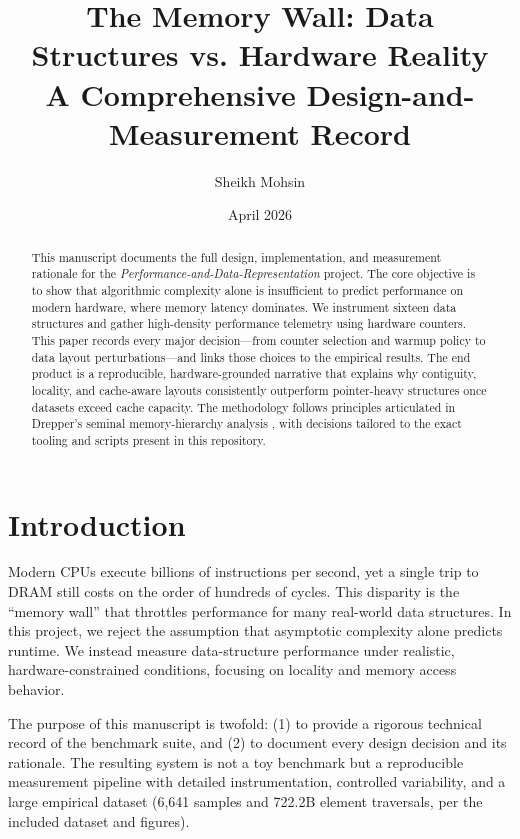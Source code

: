 \documentclass[11pt]{article}
\title{The Memory Wall: Data Structures vs. Hardware Reality \\
\large A Comprehensive Design-and-Measurement Record}
\author{Sheikh Mohsin}
\date{April 2026}
\begin{document}
\maketitle

\begin{abstract}
This manuscript documents the full design, implementation, and measurement rationale for the \textit{Performance-and-Data-Representation} project. The core objective is to show that algorithmic complexity alone is insufficient to predict performance on modern hardware, where memory latency dominates. We instrument sixteen data structures and gather high-density performance telemetry using hardware counters. This paper records every major decision---from counter selection and warmup policy to data layout perturbations---and links those choices to the empirical results. The end product is a reproducible, hardware-grounded narrative that explains why contiguity, locality, and cache-aware layouts consistently outperform pointer-heavy structures once datasets exceed cache capacity. The methodology follows principles articulated in Drepper's seminal memory-hierarchy analysis \citep{drepper2007}, with decisions tailored to the exact tooling and scripts present in this repository.
\end{abstract}

\tableofcontents
\clearpage

\section{Introduction}
Modern CPUs execute billions of instructions per second, yet a single trip to DRAM still costs on the order of hundreds of cycles. This disparity is the ``memory wall'' that throttles performance for many real-world data structures. In this project, we reject the assumption that asymptotic complexity alone predicts runtime. We instead measure data-structure performance under realistic, hardware-constrained conditions, focusing on locality and memory access behavior. 

The purpose of this manuscript is twofold: (1) to provide a rigorous technical record of the benchmark suite, and (2) to document every design decision and its rationale. The resulting system is not a toy benchmark but a reproducible measurement pipeline with detailed instrumentation, controlled variability, and a large empirical dataset (6,641 samples and 722.2B element traversals, per the included dataset and figures).
\end{document}
